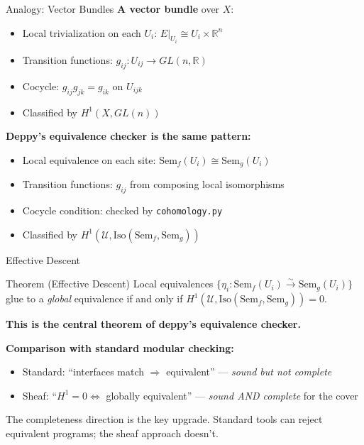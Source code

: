 \documentclass[aspectratio=169,10pt]{beamer}
\newcommand{\Uscr}{\mathcal{U}}
\newcommand{\Iso}{\mathrm{Iso}}
\newcommand{\Sem}{\mathrm{Sem}}
\begin{document}
\begin{frame}{Analogy: Vector Bundles}
\textbf{A vector bundle} over $X$:
\begin{itemize}
  \item Local trivialization on each $U_i$: $E|_{U_i} \cong U_i \times \mathbb{R}^n$
  \item Transition functions: $g_{ij} : U_{ij} \to GL(n, \mathbb{R})$
  \item Cocycle: $g_{ij} g_{jk} = g_{ik}$ on $U_{ijk}$
  \item Classified by $H^1(X, GL(n))$
\end{itemize}

\textbf{Deppy's equivalence checker is the same pattern:}
\begin{itemize}
  \item Local equivalence on each site: $\Sem_f(U_i) \cong \Sem_g(U_i)$
  \item Transition functions: $g_{ij}$ from composing local isomorphisms
  \item Cocycle condition: checked by \texttt{cohomology.py}
  \item Classified by $H^1(\Uscr, \Iso(\Sem_f, \Sem_g))$
\end{itemize}
\end{frame}

\begin{frame}{Effective Descent}
\begin{block}{Theorem (Effective Descent)}
Local equivalences $\{\eta_i : \Sem_f(U_i) \xrightarrow{\sim} \Sem_g(U_i)\}$ glue to a \emph{global} equivalence if and only if $H^1(\Uscr, \Iso(\Sem_f, \Sem_g)) = 0$.
\end{block}

\textbf{This is the central theorem of deppy's equivalence checker.}

\vspace{0.3em}
\textbf{Comparison with standard modular checking:}
\begin{itemize}
  \item Standard: ``interfaces match $\Rightarrow$ equivalent'' --- \emph{sound but not complete}
  \item Sheaf: ``$H^1 = 0 \Leftrightarrow$ globally equivalent'' --- \emph{sound AND complete} for the cover
\end{itemize}

\vspace{0.3em}
The completeness direction is the key upgrade. Standard tools can reject equivalent programs; the sheaf approach doesn't.
\end{frame}
\end{document}
